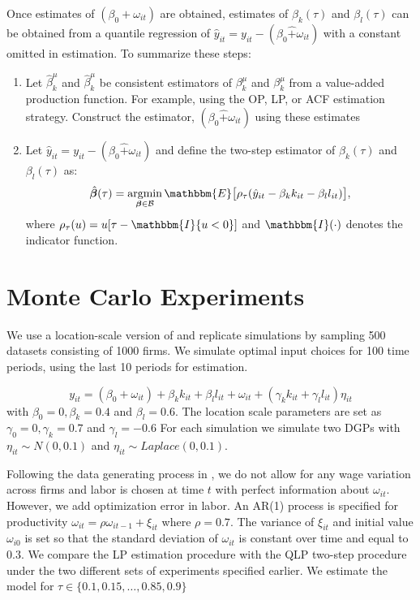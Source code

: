 \documentclass[11pt]{article}
\begin{document}
Once estimates of $(\beta_{0}+\omega_{it})$ are obtained, estimates of $\beta_{k}(\tau)$ and $\beta_{l}(\tau)$
can be obtained from a quantile regression of $\hat{y}_{it}=y_{it}-(\beta_{0}\hat{+}\omega_{it})$ with a constant omitted in estimation. To summarize these steps:
\begin{enumerate}
	\item Let $\hat{\beta}_{k}^{\mu}$ and $\hat{\beta}_{k}^{\mu}$ be consistent estimators of $\beta_{k}^{\mu}$ and $\beta_{k}^{\mu}$ from a value-added production function. For example, using the OP, LP, or ACF estimation strategy. Construct the estimator, $(\beta_{0}\hat{+}\omega_{it})$ using these estimates
	\item Let $\hat{y}_{it}=y_{it}-(\beta_{0}\hat{+}\omega_{it})$ and define the two-step estimator of $\beta_{k}(\tau)$ and $\beta_{l}(\tau)$ as:
	\begin{equation*}
	\hat{\boldsymbol{\beta}}(\tau)=\underset{\boldsymbol{\beta}\in\mathcal{B}}{\operatorname{argmin}}\, \mathbbm{E}\big[\rho_{\tau}(\hat{y}_{it}-\beta_{k}k_{it}-\beta_{l}l_{it})\big],
	\end{equation*}
	where $\rho_{\tau}(u)=u[\tau-\mathbbm{I}\{u<0\}]$ and $\mathbbm{I}(\cdot)$ denotes the indicator function.
\end{enumerate}

\section{Monte Carlo Experiments} \label{montecarlo}
We use a location-scale version of \cite{Levinsohn2003} and replicate \cite{Ackerberg2015} simulations by sampling 500 datasets consisting of 1000 firms. We simulate optimal input choices for 100 time periods, using the last 10 periods for estimation. 

\begin{equation}
y_{it}=(\beta_{0}+\omega_{it})+\beta_{k}k_{it}+\beta_{l}l_{it}+\omega_{it}+(\gamma_{k}k_{it}+\gamma_{l}l_{it})\eta_{it}
\end{equation}
with $\beta_{0}=0, \beta_{k}=0.4$ and $\beta_{l}=0.6$. The location scale parameters are set as $\gamma_{0}=0, \gamma_{k}=0.7$ and $\gamma_{l}=-0.6$ For each simulation we simulate two DGPs with $\eta_{it}\sim N(0,0.1)$ and $\eta_{it}\sim Laplace(0,0.1)$.

Following the data generating process in \cite{Ackerberg2015}, we do not allow for any wage variation across firms and labor is chosen at time $t$ with perfect information about $\omega_{it}$. However, we add optimization error in labor. An AR(1) process is specified for productivity $\omega_{it}=\rho\omega_{it-1}+\xi_{it}$ where $\rho=0.7$. The variance of $\xi_{it}$ and initial value $\omega_{i0}$ is set so that the standard deviation of $\omega_{it}$ is constant over time and equal to $0.3$. We compare the LP estimation procedure with the QLP two-step procedure under the two different sets of experiments specified earlier. We estimate the model for $\tau\in\{0.1, 0.15, \dots, 0.85, 0.9\}$ 
\end{document}
